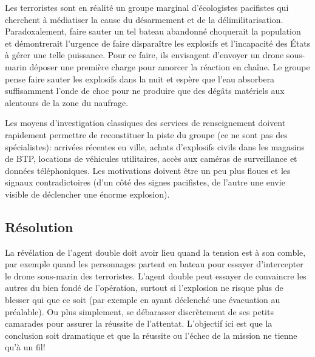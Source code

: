 Les \og terroristes \fg sont en réalité un groupe marginal d'écologistes pacifistes qui cherchent à médiatiser la cause du désarmement et de la délimilitarisation.
Paradoxalement, faire sauter un tel bateau abandonné choquerait la population et démontrerait l'urgence de faire disparaître les explosifs et l'incapacité des États à gérer une telle puissance.
Pour ce faire, ils envisagent d'envoyer un drone sous-marin déposer une première charge pour amorcer la réaction en chaîne.
Le groupe pense faire sauter les explosifs dans la nuit et espère que l'eau absorbera suffisamment l'onde de choc pour ne produire que des dégâts matériels aux alentours de la zone du naufrage.

Les moyens d'investigation classiques des services de renseignement doivent rapidement permettre de reconstituer la piste du groupe (ce ne sont pas des spécialistes): arrivées récentes en ville, achats d'explosifs civils dans les magasins de BTP, locations de véhicules utilitaires, accès aux caméras de surveillance et données téléphoniques.
Les motivations doivent être un peu plus floues et les signaux contradictoires (d'un côté des signes pacifistes, de l'autre une envie visible de déclencher une énorme explosion).

\subsection{Résolution}

La révélation de l'agent double doit avoir lieu quand la tension est à son comble, par exemple quand les personnages partent en bateau pour essayer d'intercepter le drone sous-marin des terroristes.
L'agent double peut essayer de convaincre les autres du bien fondé de l'opération, surtout si l'explosion ne risque plus de blesser qui que ce soit (par exemple en ayant déclenché une évacuation au préalable).
Ou plus simplement, se débarasser discrètement de ses petits camarades pour assurer la réussite de l'attentat.
L'objectif ici est que la conclusion soit dramatique et que la réussite ou l'échec de la mission ne tienne qu'à un fil!
